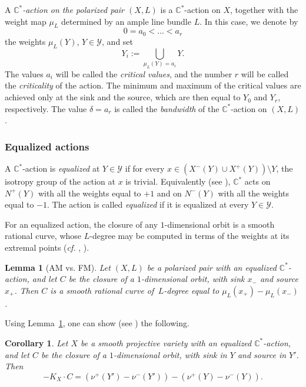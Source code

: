 \documentclass[10pt,a4paper]{article}
\numberwithin{equation}{section}
\newtheorem{lemma}[theorem]{Lemma}
\newtheorem{corollary}[theorem]{Corollary}
\theoremstyle{definition}
\theoremstyle{remark}
\def\C{{\mathbb C}}
\def\cY{{\mathcal Y}}
\begin{document}
A {\em $\C^*$-action on the polarized pair $(X,L)$} is a $\C^*$-action on $X$, together with the weight map $\mu_L$ determined by an ample line bundle $L$.  In this case, we denote by
$$
0=a_0<\dots<a_r
$$ 
the weights $\mu_L(Y)$, $Y\in\cY$, 
and set 
$$
Y_i:=\bigcup_{\mu_L(Y)=a_i}Y.
$$ 
The values $a_i$ will be called the {\em critical values}, and the number $r$ will be called the {\em criticality} of the action.
The minimum and maximum of the critical values are achieved only at the  sink and the  source, 
which are then equal to $Y_0$ and $Y_r$, respectively. The value $\delta=a_r$ is called the {\em bandwidth} of the $\C^*$-action on $(X,L)$. 

\subsubsection{Equalized actions}\label{sssec:equal}

A $\C^*$-action  is {\em  equalized} at $Y\in\cY$ if for every $x\in (X^{-}(Y)\cup X^{+}(Y))\setminus Y$, the isotropy group of the action at $x$ is trivial. Equivalently (see \cite[Lemma 2.1]{WORS3}), $\C^*$ acts on $N^+(Y)$ with all the weights equal to $+1$ and on $N^-(Y)$ with all the weights equal to $-1$. The action is called {\em equalized} if it is equalized at every $Y \in \cY$.

For an equalized action, the closure of any $1$-dim\-ens\-ional orbit is a smooth rational curve, whose $L$-degree may be computed in terms of the weights at its extremal points (\textit{cf.} \cite[Lemma 2.2]{WORS3}, \cite[Corollary 3.2]{RW}).  

\begin{lemma}[AM vs. FM]\label{lem:AMvsFM}
Let $(X,L)$ be a polarized pair with an equalized $\C^*$-action, and let $C$ be the closure of a $1$-dimensional orbit, with sink  $x_-$ and source $x_+$. Then $C$ is a smooth rational curve of\, $L$-degree  equal to $\mu_L(x_+)-\mu_L(x_-)$.
\end{lemma} 

Using Lemma~\ref{lem:AMvsFM}, one can show (see \cite[Corollary 2.4]{OS2}) the following. 

\begin{corollary} \label{cor:can} 
Let $X$ be a smooth projective variety  with an equalized $\C^*$-action, and let $C$ be the closure of a $1$-dimensional orbit, with sink  in $Y$ and source in  $Y'$. Then 
\[
-K_X \cdot C =\left(\nu^+(Y')-\nu^-(Y')\right)-\left(\nu^+(Y) -\nu^-(Y)\right).
\]
\end{corollary}
\end{document}
